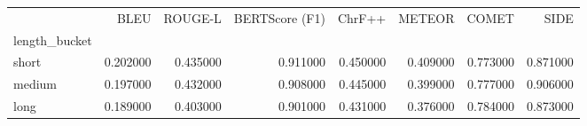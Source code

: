 \begin{tabular}{lrrrrrrr}
\toprule
 & BLEU & ROUGE-L & BERTScore (F1) & ChrF++ & METEOR & COMET & SIDE \\
length_bucket &  &  &  &  &  &  &  \\
\midrule
short & 0.202000 & 0.435000 & 0.911000 & 0.450000 & 0.409000 & 0.773000 & 0.871000 \\
medium & 0.197000 & 0.432000 & 0.908000 & 0.445000 & 0.399000 & 0.777000 & 0.906000 \\
long & 0.189000 & 0.403000 & 0.901000 & 0.431000 & 0.376000 & 0.784000 & 0.873000 \\
\bottomrule
\end{tabular}
